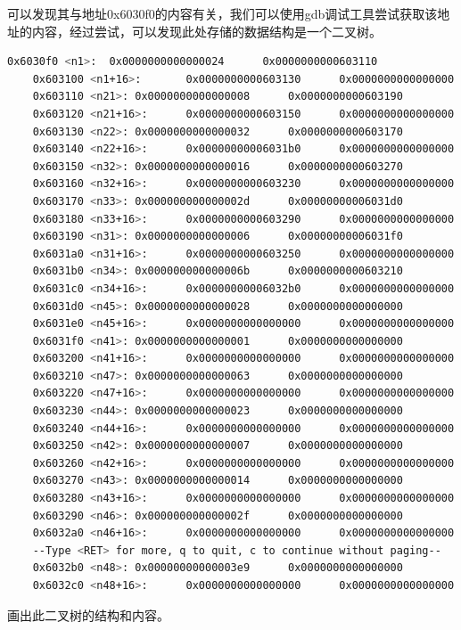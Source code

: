 \documentclass{article}
\begin{document}
可以发现其与地址0x6030f0的内容有关，我们可以使用gdb调试工具尝试获取该地址的内容，经过尝试，可以发现此处存储的数据结构是一个二叉树。
\begin{lstlisting}[language=bash, commentstyle=\color{black}]
    0x6030f0 <n1>:  0x0000000000000024      0x0000000000603110
    0x603100 <n1+16>:       0x0000000000603130      0x0000000000000000
    0x603110 <n21>: 0x0000000000000008      0x0000000000603190
    0x603120 <n21+16>:      0x0000000000603150      0x0000000000000000
    0x603130 <n22>: 0x0000000000000032      0x0000000000603170
    0x603140 <n22+16>:      0x00000000006031b0      0x0000000000000000
    0x603150 <n32>: 0x0000000000000016      0x0000000000603270
    0x603160 <n32+16>:      0x0000000000603230      0x0000000000000000
    0x603170 <n33>: 0x000000000000002d      0x00000000006031d0
    0x603180 <n33+16>:      0x0000000000603290      0x0000000000000000
    0x603190 <n31>: 0x0000000000000006      0x00000000006031f0
    0x6031a0 <n31+16>:      0x0000000000603250      0x0000000000000000
    0x6031b0 <n34>: 0x000000000000006b      0x0000000000603210
    0x6031c0 <n34+16>:      0x00000000006032b0      0x0000000000000000
    0x6031d0 <n45>: 0x0000000000000028      0x0000000000000000
    0x6031e0 <n45+16>:      0x0000000000000000      0x0000000000000000
    0x6031f0 <n41>: 0x0000000000000001      0x0000000000000000
    0x603200 <n41+16>:      0x0000000000000000      0x0000000000000000
    0x603210 <n47>: 0x0000000000000063      0x0000000000000000
    0x603220 <n47+16>:      0x0000000000000000      0x0000000000000000
    0x603230 <n44>: 0x0000000000000023      0x0000000000000000
    0x603240 <n44+16>:      0x0000000000000000      0x0000000000000000
    0x603250 <n42>: 0x0000000000000007      0x0000000000000000
    0x603260 <n42+16>:      0x0000000000000000      0x0000000000000000
    0x603270 <n43>: 0x0000000000000014      0x0000000000000000
    0x603280 <n43+16>:      0x0000000000000000      0x0000000000000000
    0x603290 <n46>: 0x000000000000002f      0x0000000000000000
    0x6032a0 <n46+16>:      0x0000000000000000      0x0000000000000000
    --Type <RET> for more, q to quit, c to continue without paging--
    0x6032b0 <n48>: 0x00000000000003e9      0x0000000000000000
    0x6032c0 <n48+16>:      0x0000000000000000      0x0000000000000000
\end{lstlisting}

画出此二叉树的结构和内容。
\end{document}
